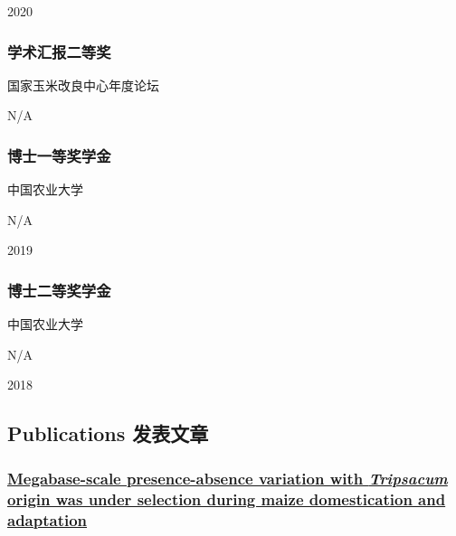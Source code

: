 \documentclass[]{article}
\begin{document}
2020

\hypertarget{ux5b66ux672fux6c47ux62a5ux4e8cux7b49ux5956}{%
\subsubsection{学术汇报二等奖}\label{ux5b66ux672fux6c47ux62a5ux4e8cux7b49ux5956}}

国家玉米改良中心年度论坛

N/A

\hypertarget{ux535aux58ebux4e00ux7b49ux5956ux5b66ux91d1}{%
\subsubsection{博士一等奖学金}\label{ux535aux58ebux4e00ux7b49ux5956ux5b66ux91d1}}

中国农业大学

N/A

2019

\hypertarget{ux535aux58ebux4e8cux7b49ux5956ux5b66ux91d1}{%
\subsubsection{博士二等奖学金}\label{ux535aux58ebux4e8cux7b49ux5956ux5b66ux91d1}}

中国农业大学

N/A

2018

\hypertarget{publications-ux53d1ux8868ux6587ux7ae0}{%
\subsection{Publications
发表文章}\label{publications-ux53d1ux8868ux6587ux7ae0}}

\hypertarget{megabase-scale-presence-absence-variation-with-tripsacum-origin-was-under-selection-during-maize-domestication-and-adaptation}{%
\subsubsection{\texorpdfstring{\href{https://doi.org/10.1186/s13059-021-02448-2}{Megabase-scale
presence-absence variation with \emph{Tripsacum} origin was under
selection during maize domestication and
adaptation}}{Megabase-scale presence-absence variation with Tripsacum origin was under selection during maize domestication and adaptation}}\label{megabase-scale-presence-absence-variation-with-tripsacum-origin-was-under-selection-during-maize-domestication-and-adaptation}}
\end{document}
